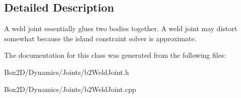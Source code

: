 \subsection{Detailed Description}
A weld joint essentially glues two bodies together. A weld joint may distort somewhat because the island constraint solver is approximate. 

The documentation for this class was generated from the following files\+:\begin{DoxyCompactItemize}
\item 
Box2\+D/\+Dynamics/\+Joints/b2\+Weld\+Joint.\+h\item 
Box2\+D/\+Dynamics/\+Joints/b2\+Weld\+Joint.\+cpp\end{DoxyCompactItemize}
